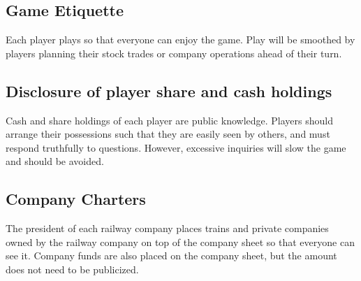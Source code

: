 \documentclass{article}
\begin{document}
\begin{CJK}{UTF8}{min}


\section{Game Etiquette}
Each player plays so that everyone can enjoy the game. Play will be
smoothed by players planning their stock trades or company operations
ahead of their turn.


\subsection{Disclosure of player share and cash holdings}
Cash and share holdings of each player are public knowledge. Players
should arrange their possessions such that they are easily seen by
others, and must respond truthfully to questions. However, excessive
inquiries will slow the game and should be avoided.



\subsection{Company Charters}

The president of each railway company places trains and private
companies owned by the railway company on top of the company sheet so
that everyone can see it. Company funds are also placed on the company
sheet, but the amount does not need to be publicized.




\end{CJK}
\end{document}
